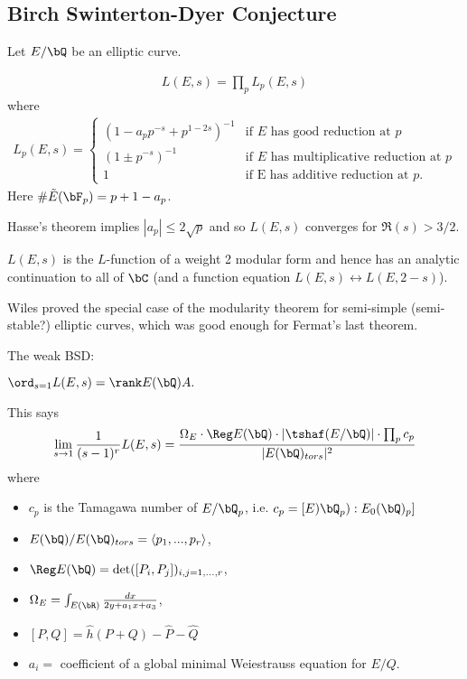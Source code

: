 \subsection{Birch Swinterton-Dyer Conjecture}
Let $E/\bQ$ be an elliptic curve.
\begin{defn}\label{defn:lec24-1}
	\begin{align*}
		L(E,s) = \prod_p L_p(E,s)
	\end{align*}
	where
	\begin{align*}
		L_p(E,s) = 
		\begin{cases}
			\left(1 - a_p p^{-s} + p^{1 - 2s}\right)^{-1} & \text{if $E$ has good reduction at $p$} \\
			(1 \pm p^{-s})^{-1} & \text{if $E$ has multiplicative reduction at $p$} \\
			1 & \text{if E has additive reduction at $p$}.
		\end{cases}
	\end{align*}
	Here $\# \tilde{E}(\bF_p) = p+1 - a_p$.
\end{defn}
Hasse's theorem implies $|a_p| \leq 2\sqrt{p}$ and so $L(E,s)$ converges for $\Re(s) > 3/2.$

\begin{thm}\label{thm:modularity-theorem}
	$L(E,s)$ is the $L$-function of a weight 2 modular form and hence has an analytic continuation to all of $\bC$ (and a function equation $L(E,s) \leftrightarrow L(E,2 - s)$).
\end{thm}
Wiles proved the special case of the modularity theorem for semi-simple (semi-stable?) elliptic curves, which was good enough for Fermat's last theorem.

The weak BSD:
\begin{conjecture}\label{conj:weak-BSD}
	$\ord_{s=1}L(E,s) = \rank E(\bQ)A.$
\end{conjecture}
\begin{conjecture}\label{conj:strong-BSD}
	This says 
	\begin{align*}
		\lim_{s\to 1} \frac{1}{(s - 1)^r} L(E,s) = \frac{\Omega_E \cdot \Reg E(\bQ) \cdot |\tshaf(E/\bQ)|\cdot \prod_p c_p}{|E(\bQ)_{tors}|^2}
	\end{align*}
	where 
	\begin{itemize}
		\item $c_p$ is the Tamagawa number of $E/\bQ_p$, i.e. $c_p = [E)\bQ_p) : E_0(\bQ)_p]$
		\item $E(\bQ)/E(\bQ)_{tors} = \langle p_1,...,p_r \rangle$,
		\item $\Reg E(\bQ) = \det([P_i, P_j])_{i,j = 1,...,r}$, 
		\item $\Omega_E = \int_{E(\bR)} \frac{dx}{2y + a_1x + a_3}$,
		\item $[P,Q] = \hat{h}(P+Q) - \hat{P} - \hat{Q}$ 
		\item $a_i = $ coefficient of a global minimal Weiestrauss equation for $E/Q$.
	\end{itemize}
\end{conjecture}

